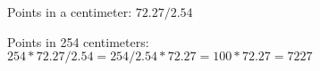 Points in a centimeter: $72.27 / 2.54$

Points in 254 centimeters: $254 * 72.27 / 2.54 = 254 / 2.54 * 72.27 = 100 * 72.27 = 7227$
